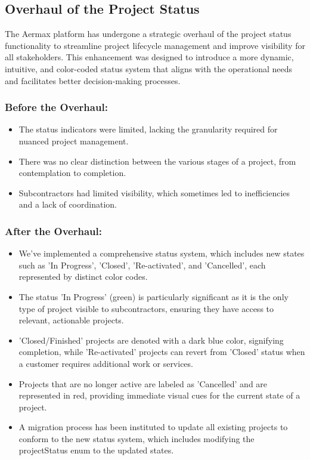 \subsection{Overhaul of the Project Status}

The Aermax platform has undergone a strategic overhaul of the project status functionality to streamline project lifecycle management and improve visibility for all stakeholders. This enhancement was designed to introduce a more dynamic, intuitive, and color-coded status system that aligns with the operational needs and facilitates better decision-making processes.

\subsubsection{Before the Overhaul:}
\begin{itemize}
    \item The status indicators were limited, lacking the granularity required for nuanced project management.
    \item There was no clear distinction between the various stages of a project, from contemplation to completion.
    \item Subcontractors had limited visibility, which sometimes led to inefficiencies and a lack of coordination.
\end{itemize}

\subsubsection{After the Overhaul:}
\begin{itemize}
    \item We've implemented a comprehensive status system, which includes new states such as 'In Progress', 'Closed', 'Re-activated', and 'Cancelled', each represented by distinct color codes.
    \item The status 'In Progress' (green) is particularly significant as it is the only type of project visible to subcontractors, ensuring they have access to relevant, actionable projects.
    \item 'Closed/Finished' projects are denoted with a dark blue color, signifying completion, while 'Re-activated' projects can revert from 'Closed' status when a customer requires additional work or services.
    \item Projects that are no longer active are labeled as 'Cancelled' and are represented in red, providing immediate visual cues for the current state of a project.
    \item A migration process has been instituted to update all existing projects to conform to the new status system, which includes modifying the projectStatus enum to the updated states.
\end{itemize}



